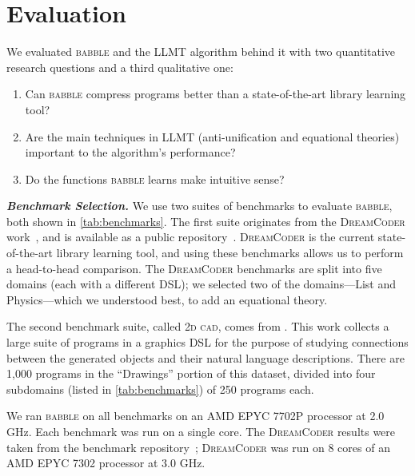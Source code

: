 \documentclass[acmsmall,screen,nonacm,review=false,timestamp=false]{acmart}
\newcommand{\emphbf}[1]{\emph{\textbf{#1}\xspace}}
\newcommand{\mypara}[1]{\smallskip\noindent\emphbf{#1.}\xspace}
\newcommand{\tname}[1]{\textsc{#1}\xspace}
\newcommand{\tool}{\tname{babble}}
\newcommand{\dc}{\tname{DreamCoder}}
\newcommand{\cogsci}{\tname{2d cad}}
\begin{document}
 \section{Evaluation}
\label{sec:eval}

We evaluated \tool and the LLMT algorithm behind it
 with two quantitative research questions and a third qualitative one:

\begin{enumerate}[label=RQ \arabic*.,ref=RQ \arabic*]
  \item Can \tool compress programs better than a state-of-the-art library learning tool?\label{rq:1}
  \item Are the main techniques in LLMT (anti-unification and equational theories)
        important to the algorithm's performance?\label{rq:2}
  \item Do the functions \tool learns make intuitive sense?\label{rq:3}
\end{enumerate}

\mypara{Benchmark Selection}
We use two suites of benchmarks to evaluate \tool, both shown in \autoref{tab:benchmarks}.
The first suite originates from the \dc work~\cite{dreamcoder},
 and is available as a public repository~\cite{compression-bench}.
\dc is the current state-of-the-art library learning tool,
and using these benchmarks allows us to perform a head-to-head comparison.
The \dc benchmarks are split into five domains (each with a different DSL);
we selected two of the domains---List and Physics---which we understood best,
to add an equational theory.

The second benchmark suite, called \cogsci, comes from \citet{cogsci-dataset}.
This work collects a large suite of programs in a graphics DSL for the
 purpose of studying connections between the generated objects and their
 natural language descriptions.
There are 1,000 programs in the ``Drawings'' portion of this dataset,
 divided into four subdomains (listed in \autoref{tab:benchmarks})
 of 250 programs each.


We ran \tool on all benchmarks on an AMD EPYC 7702P processor at 2.0 GHz.
Each benchmark was run on a single core.
The \dc results were taken from
 the benchmark repository~\cite{compression-bench};
 \dc was run on 8 cores of an AMD EPYC 7302 processor at 3.0 GHz.
\end{document}
